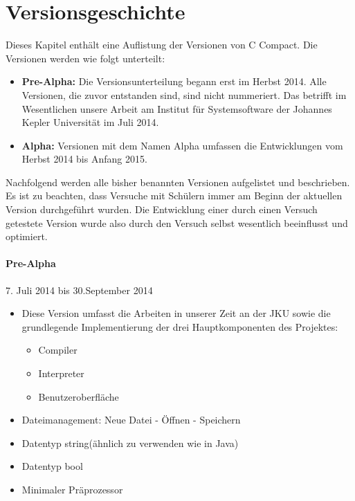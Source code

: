 

\chapter{Versionsgeschichte}
Dieses Kapitel enthält eine Auflistung der Versionen von C Compact. Die Versionen werden wie folgt unterteilt:
\begin{itemize}
\item \textbf{Pre-Alpha:} Die Versionsunterteilung begann erst im Herbst 2014. Alle Versionen, die zuvor entstanden sind, sind nicht nummeriert. Das betrifft im Wesentlichen unsere Arbeit am Institut für Systemsoftware der Johannes Kepler Universität im Juli 2014.
\item \textbf{Alpha:} Versionen mit dem Namen Alpha umfassen die Entwicklungen vom Herbst 2014 bis Anfang 2015.
\end{itemize}

Nachfolgend werden alle bisher benannten Versionen aufgelistet und beschrieben. Es ist zu beachten, dass Versuche mit Schülern immer am Beginn der aktuellen Version durchgeführt wurden. Die Entwicklung einer durch einen Versuch getestete Version wurde also durch den Versuch selbst wesentlich beeinflusst und optimiert.

\subsubsection*{Pre-Alpha}
7. Juli 2014 bis 30.September 2014
\begin{itemize}
\item Diese Version umfasst die Arbeiten in unserer Zeit an der JKU sowie die grundlegende Implementierung der drei Hauptkomponenten des Projektes:
\begin{itemize}
\item Compiler
\item Interpreter
\item Benutzeroberfläche
\end{itemize}
\item Dateimanagement: Neue Datei - Öffnen - Speichern
\item Datentyp \glqq string\grqq (ähnlich zu verwenden wie in Java)
\item Datentyp \glqq bool\grqq
\item Minimaler Präprozessor
\end{itemize}

